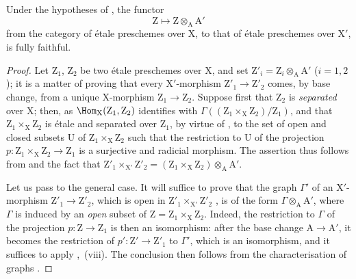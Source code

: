 \begin{corollary}[18.9.5]
\label{IV.18.9.5}
Under the hypotheses of , the functor
\begin{equation}
  \mathrm{Z}\mapsto\mathrm{Z}\otimes_{\mathrm{A}}\mathrm{A}'
  \tag{18.9.5.1}
\label{IV.18.9.5.1}
\end{equation}
from the category of \'{e}tale preschemes over $\mathrm{X}$, to that of \'{e}tale preschemes over $\mathrm{X}'$, is fully faithful.
\end{corollary}

\begin{proof}
Let $\mathrm{Z}_1$, $\mathrm{Z}_2$ be two \'{e}tale preschemes over X, and set $\mathrm{Z}'_i=\mathrm{Z}_i\otimes_{\mathrm{A}}\mathrm{A}'$ ($i=1,2$);
it is a matter of proving that every $\mathrm{X}'$-morphism $\mathrm{Z}'_1\to\mathrm{Z}'_2$ comes, by base change, from a unique X-morphism $\mathrm{Z}_1\to\mathrm{Z}_2$.
Suppose first that $\mathrm{Z}_2$ is \emph{separated} over X;
then, as $\Hom_{\mathrm{X}}(\mathrm{Z}_1,\mathrm{Z}_2)$ identifies with $\Gamma((\mathrm{Z}_1\times_{\mathrm{X}}\mathrm{Z}_2)/\mathrm{Z}_1)$, and that $\mathrm{Z}_1\times_{\mathrm{X}}\mathrm{Z}_2$ is \'{e}tale and separated over $\mathrm{Z}_1$, by virtue of , to the set of open and closed subsets U of $\mathrm{Z}_1\times_{\mathrm{X}}\mathrm{Z}_2$ such that the restriction to U of the projection $p:\mathrm{Z}_1\times_{\mathrm{X}}\mathrm{Z}_2\to\mathrm{Z}_1$ is a surjective and radicial morphism.
The assertion thus follows from  and the fact that $\mathrm{Z}'_1\times_{\mathrm{X}'}\mathrm{Z}'_2=(\mathrm{Z}_1\times_{\mathrm{X}}\mathrm{Z}_2)\otimes_{\mathrm{A}}\mathrm{A}'$.

Let us pass to the general case.
It will suffice to prove that the graph $\Gamma'$ of an $\mathrm{X}'$-morphism $\mathrm{Z}'_1\to\mathrm{Z}'_2$, which is open in $\mathrm{Z}'_1\times_{\mathrm{X}'}\mathrm{Z}'_2$ , is of the form $\Gamma\otimes_{\mathrm{A}}\mathrm{A}'$, where $\Gamma$ is induced by an \emph{open} subset of $\mathrm{Z}=\mathrm{Z}_1\times_{\mathrm{X}}\mathrm{Z}_2$.
Indeed, the restriction to $\Gamma$ of the projection $p:\mathrm{Z}\to\mathrm{Z}_1$ is then an isomorphism: after the base change $\mathrm{A}\to\mathrm{A}'$, it becomes the restriction of $p':\mathrm{Z}'\to\mathrm{Z}'_1$ to $\Gamma'$, which is an isomorphism, and it suffices to apply ,~(viii).
The conclusion then follows from the characterisation of graphs .


\end{proof}
